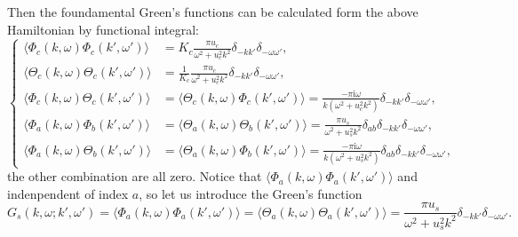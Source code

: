 \documentclass[10pt]{extarticle}
\newcommand{\ii}{\mathrm{i}}
\begin{document}
Then the foundamental Green's functions can be calculated form the above Hamiltonian by functional integral: 
\[\left\{
\begin{aligned}
	\langle \Phi_c(k,\omega)\Phi_c(k',\omega')\rangle&=K_c\frac{\pi u_c}{\omega^2+u_c^2k^2}\delta_{-kk'}\delta_{-\omega\omega'},\\
	\langle \Theta_c(k,\omega)\Theta_c(k',\omega')\rangle&=\frac{1}{K_c}\frac{\pi u_c}{\omega^2+u_c^2k^2}\delta_{-kk'}\delta_{-\omega\omega'},\\
	\langle \Phi_c(k,\omega)\Theta_c(k',\omega')\rangle&=\langle \Theta_c(k,\omega)\Phi_c(k',\omega')\rangle=\frac{-\pi\ii\omega}{k(\omega^2+u_c^2k^2)}\delta_{-kk'}\delta_{-\omega\omega'},\\
	\langle \Phi_a(k,\omega)\Phi_b(k',\omega')\rangle&=\langle \Theta_a(k,\omega)\Theta_b(k',\omega')\rangle=\frac{\pi u_s}{\omega^2+u_s^2k^2}\delta_{ab}\delta_{-kk'}\delta_{-\omega\omega'},\\
	\langle \Phi_a(k,\omega)\Theta_b(k',\omega')\rangle&=\langle \Theta_a(k,\omega)\Phi_b(k',\omega')\rangle=\frac{-\pi\ii\omega}{k(\omega^2+u_s^2k^2)}\delta_{ab}\delta_{-kk'}\delta_{-\omega\omega'},
\end{aligned}
\right.
\]
the other combination are all zero. Notice that $\langle \Phi_a(k,\omega)\Phi_a(k',\omega')\rangle$ and indenpendent of index $a$, so let us introduce the Green's function
\[
	G_s(k,\omega;k',\omega')=\langle \Phi_a(k,\omega)\Phi_a(k',\omega')\rangle=\langle \Theta_a(k,\omega)\Theta_a(k',\omega')\rangle=\frac{\pi u_s}{\omega^2+u_s^2k^2}\delta_{-kk'}\delta_{-\omega\omega'}.
\]
\end{document}
